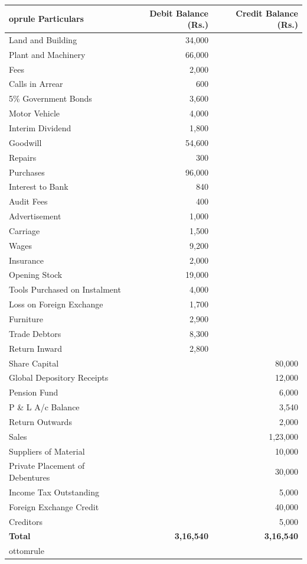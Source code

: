 \documentclass[11pt,a4paper]{article}
\begin{document}
\begin{center}
  \small
  
\begin{tabular}{lrr}
     oprule
   \textbf{Particulars} &   \textbf{Debit Balance (Rs.)} &   \textbf{Credit Balance (Rs.)} \\
    \midrule
    Land and Building & 34,000 & \\
    Plant and Machinery & 66,000 & \\
    Fees & 2,000 & \\
    Calls in Arrear & 600 & \\
    5\% Government Bonds & 3,600 & \\
    Motor Vehicle & 4,000 & \\
    Interim Dividend & 1,800 & \\
    Goodwill & 54,600 & \\
    Repairs & 300 & \\
    Purchases & 96,000 & \\
    Interest to Bank & 840 & \\
    Audit Fees & 400 & \\
    Advertisement & 1,000 & \\
    Carriage & 1,500 & \\
    Wages & 9,200 & \\
    Insurance & 2,000 & \\
    Opening Stock & 19,000 & \\
    Tools Purchased on Instalment & 4,000 & \\
    Loss on Foreign Exchange & 1,700 & \\
    Furniture & 2,900 & \\
    Trade Debtors & 8,300 & \\
    Return Inward & 2,800 & \\
    Share Capital & & 80,000 \\
    Global Depository Receipts & & 12,000 \\
    Pension Fund & & 6,000 \\
    P \& L A/c Balance & & 3,540 \\
    Return Outwards & & 2,000 \\
    Sales & & 1,23,000 \\
    Suppliers of Material & & 10,000 \\
    Private Placement of Debentures & & 30,000 \\
    Income Tax Outstanding & & 5,000 \\
    Foreign Exchange Credit & & 40,000 \\
    Creditors & & 5,000 \\
    \midrule
   \textbf{Total} &   \textbf{3,16,540} &   \textbf{3,16,540} \\
    ottomrule
  \end{tabular}
\end{center}
\end{document}
